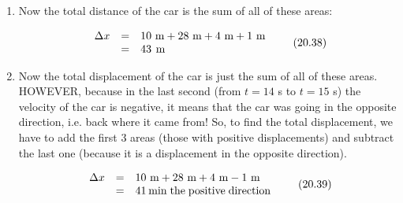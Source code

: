 {\begin{mdframed}[linewidth=4, leftmargin=40, rightmargin=40]
\begin{exercise}
\begin{enumerate}[noitemsep, label=\textbf{Step} \textbf{\arabic*}. ]
\begin{equation}
      \end{equation}
For 14 -- 15 seconds the displacement is equal to the area of the triangle below the time axis:
\label{m38795*id74132}\nopagebreak\noindent{}
    \begin{equation}
    \begin{array}{ccc}\hfill {\mathrm{Area}}_{▵}& =& \frac{1}{2}\phantom{\rule{3.33333pt}{0ex}}b\ensuremath{\times}h\hfill \\ & =& \frac{1}{2}\ensuremath{\times}1\phantom{\rule{3.33333pt}{0ex}}\mathrm{s}\phantom{\rule{4pt}{0ex}}\ensuremath{\times}2\phantom{\rule{0.166667em}{0ex}}\mathrm{m}\ensuremath{\cdot}{\mathrm{s}}^{-1}\phantom{\rule{4pt}{0ex}}\hfill \\ & =& 1\phantom{\rule{4pt}{0ex}}\mathrm{m}\hfill \end{array}\tag{20.37}
      \end{equation}
    \par 
      \item  
      \label{m38795*id74273}Now the total distance of the car is the sum of all of these areas:\par 
      \label{m38795*id74277}\nopagebreak\noindent{}
        
    \begin{equation}
    \begin{array}{ccc}\hfill \Delta x& =& 10\phantom{\rule{3.33333pt}{0ex}}\mathrm{m}+28\phantom{\rule{3.33333pt}{0ex}}\mathrm{m}+4\phantom{\rule{3.33333pt}{0ex}}\mathrm{m}+1\phantom{\rule{3.33333pt}{0ex}}\mathrm{m}\hfill \\ & =& 43\phantom{\rule{4pt}{0ex}}\mathrm{m}\hfill \end{array}\tag{20.38}
      \end{equation}
      \item  
      \label{m38795*id74382}Now the total displacement of the car is just the sum of all of these areas. HOWEVER, because in the last second (from $t=14$ s to $t=15$ s) the velocity of the car is negative, it means that the car was going in the opposite direction, i.e. back where it came from! So, to find the total displacement, we have to add the first 3 areas (those with positive displacements) and subtract the last one (because it is a displacement in the opposite direction).\par 
      \label{m38795*id74419}\nopagebreak\noindent{}
    \begin{equation}
    \begin{array}{ccc}\hfill \Delta x& =& 10\phantom{\rule{3.33333pt}{0ex}}\mathrm{m}+28\phantom{\rule{3.33333pt}{0ex}}\mathrm{m}+4\phantom{\rule{3.33333pt}{0ex}}\mathrm{m}-1\phantom{\rule{3.33333pt}{0ex}}\mathrm{m}\hfill \\ & =& 41\phantom{\rule{2pt}{0ex}}\mathrm{m}\mathrm{in\; the\; positive\; direction}\hfill \end{array}\tag{20.39}
      \end{equation}
      \end{enumerate}
    \end{exercise}
    \end{mdframed}
    }
